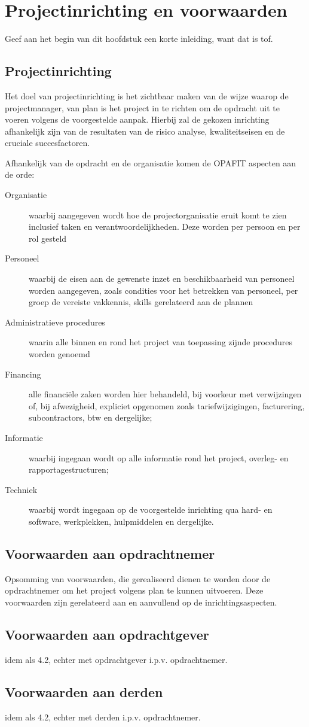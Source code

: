 \section{Projectinrichting en voorwaarden}

Geef aan het begin van dit hoofdstuk een korte inleiding, want dat is tof. %

\subsection{Projectinrichting}

Het doel van projectinrichting is het zichtbaar maken van de wijze waarop de projectmanager,
van plan is het project in te richten om de opdracht uit te voeren volgens de voorgestelde aanpak.
Hierbij zal de gekozen inrichting afhankelijk zijn van de resultaten van de risico analyse,
kwaliteitseisen en de cruciale succesfactoren.

Afhankelijk van de opdracht en de organisatie komen de OPAFIT aspecten aan de orde:
\begin{description}
  \item[Organisatie] waarbij aangegeven wordt hoe de projectorganisatie eruit komt te zien inclusief taken en verantwoordelijkheden.
  Deze worden per persoon en per rol gesteld
  \item[Personeel] waarbij de eisen aan de gewenste inzet en beschikbaarheid van personeel worden aangegeven,
  zoals condities voor het betrekken van personeel, per groep de vereiste vakkennis, skills gerelateerd aan de plannen
  \item[Administratieve procedures] waarin alle binnen en rond het project van toepassing zijnde procedures worden genoemd
  \item[Financing] alle financi\"ele zaken worden hier behandeld, bij voorkeur met verwijzingen of, bij afwezigheid,
  expliciet opgenomen zoals tariefwijzigingen, facturering, subcontractors, btw en dergelijke;
  \item[Informatie] waarbij ingegaan wordt op alle informatie rond het project, overleg- en rapportagestructuren;
  \item[Techniek] waarbij wordt ingegaan op de voorgestelde inrichting qua hard- en software, werkplekken, hulpmiddelen en dergelijke.
\end{description}

\subsection{Voorwaarden aan opdrachtnemer}
Opsomming van voorwaarden, die gerealiseerd dienen te worden door de opdrachtnemer om het project volgens plan te kunnen uitvoeren.
Deze voorwaarden zijn gerelateerd aan en aanvullend op de inrichtingsaspecten.

\subsection{Voorwaarden aan opdrachtgever}

idem als 4.2, echter met opdrachtgever i.p.v. opdrachtnemer.

\subsection{Voorwaarden aan derden}

idem als 4.2, echter met derden i.p.v. opdrachtnemer.

